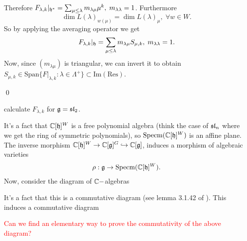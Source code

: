 \begin{itemize}
    Therefore $F_{\lambda,k}|_{\mathfrak{h}^*}=\sum_{\mu\leq\lambda}m_{\lambda\mu}\mu^k,\;m_{\lambda\lambda}=1$. 
    Furthermore
    \begin{equation}
        \dim L(\lambda)_{w(\mu)}=\dim L(\lambda)_\mu,\;\forall w\in W.
    \end{equation}
    So by applying the averaging operator we get 
    \begin{equation}
        F_{\lambda,k}|_{\mathfrak{h}} = \sum_{\mu\leq\lambda}m_{\lambda\mu}S_{\mu,k},\;m_{\lambda\lambda}=1.
    \end{equation}
    Now, since $(m_{\lambda\mu})$ is triangular, we can invert it to 
    obtain $S_{\mu,k}\in\text{Span}\{F|_{\lambda,k}:\lambda\in\Lambda^+\}\subset\text{Im}(\text{Res})$.
\end{itemize}
\qed
\begin{example}
    \TODO calculate $F_{\lambda,k}$ for $\mathfrak{g}=\mathfrak{sl}_2$.
\end{example}
It's a fact that $\mathbb{C}[\mathfrak{h}]^W$ is a free polynomial algebra (think the case of $\mathfrak{sl}_n$ where we get the ring 
of symmetric polynomials), so $\text{Specm}(\mathbb{C}[\mathfrak{h}]^W)$ is an affine plane. The inverse morphism 
$\mathbb{C}[\mathfrak{h}]^W\to \mathbb{C}[\mathfrak{g}]^G\hookrightarrow \mathbb{C}[\mathfrak{g}]$, induces a morphism of algebraic varieties 
\begin{equation}
    \rho: \mathfrak{g}\to \text{Specm}(\mathbb{C}[\mathfrak{h}]^W).
\end{equation}
Now, consider the diagram of $\mathbb{C}-$algebras 
\begin{center}
\end{center}
It's a fact that this is a commutative diagram (see lemma 3.1.42 of \cite{chriss1997representation}). This induces a 
commutative diagram 
    \begin{center}
    \end{center}
\textcolor{red}{Can we find an elementary way to prove the commutativity of the above diagram?}

